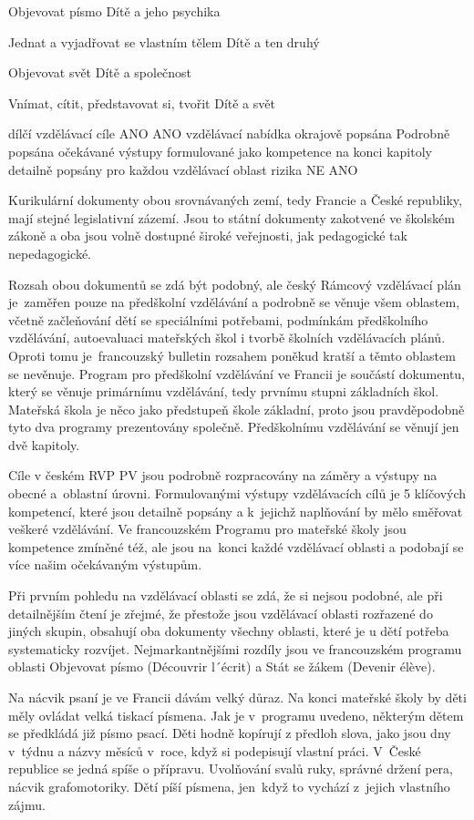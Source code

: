 Objevovat písmo
Dítě a jeho psychika

Jednat a vyjadřovat se vlastním tělem
Dítě a ten druhý

Objevovat svět
Dítě a společnost

Vnímat, cítit, představovat si, tvořit
Dítě a svět

dílčí vzdělávací cíle
ANO
ANO
vzdělávací nabídka
okrajově popsána
Podrobně popsána
očekávané výstupy
formulované jako kompetence na konci kapitoly
detailně popsány pro každou vzdělávací oblast
rizika
NE
ANO

Kurikulární dokumenty obou srovnávaných zemí, tedy Francie a České republiky, mají stejné legislativní zázemí. Jsou to státní dokumenty zakotvené ve školském zákoně a oba jsou volně dostupné široké veřejnosti, jak pedagogické tak nepedagogické. 

Rozsah obou dokumentů se zdá být podobný, ale český Rámcový vzdělávací plán je zaměřen pouze na předškolní vzdělávání a podrobně se věnuje všem oblastem, včetně začleňování dětí se speciálními potřebami, podmínkám předškolního vzdělávání, autoevaluaci mateřských škol i tvorbě školních vzdělávacích plánů. Oproti tomu je francouzský bulletin rozsahem poněkud kratší a těmto oblastem se nevěnuje. Program pro předškolní vzdělávání ve Francii je součástí dokumentu, který se věnuje primárnímu vzdělávání, tedy prvnímu stupni základních škol. Mateřská škola je něco jako předstupeň škole základní, proto jsou pravděpodobně tyto dva programy prezentovány společně. Předškolnímu vzdělávání se věnují jen dvě kapitoly.

Cíle v českém RVP PV jsou podrobně rozpracovány na záměry a výstupy na obecné a oblastní úrovni. Formulovanými výstupy vzdělávacích cílů je 5 klíčových kompetencí, které jsou detailně popsány a k jejichž naplňování by mělo směřovat veškeré vzdělávání. Ve francouzském Programu pro mateřské školy jsou kompetence zmíněné též, ale jsou na konci každé vzdělávací oblasti a podobají se více našim očekávaným výstupům.

Při prvním pohledu na vzdělávací oblasti se zdá, že si nejsou podobné, ale při detailnějším čtení je zřejmé, že přestože jsou vzdělávací oblasti rozřazené do jiných skupin, obsahují oba dokumenty všechny oblasti, které je u dětí potřeba systematicky rozvíjet. Nejmarkantnějšími rozdíly jsou ve francouzském programu oblasti Objevovat písmo (Découvrir l´écrit) a Stát se žákem (Devenir élève).

Na nácvik psaní je ve Francii dávám velký důraz. Na konci mateřské školy by děti měly ovládat velká tiskací písmena. Jak je v programu uvedeno, některým dětem se předkládá již písmo psací. Děti hodně kopírují z předloh slova, jako jsou dny v týdnu a názvy měsíců v roce, když si podepisují vlastní práci. V České republice se jedná spíše o přípravu. Uvolňování svalů ruky, správné držení pera, nácvik grafomotoriky. Dětí píší písmena, jen když to vychází z jejich vlastního zájmu. 

